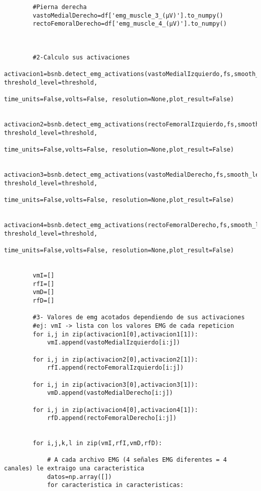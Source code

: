 \begin{lstlisting}
        #Pierna derecha
        vastoMedialDerecho=df['emg_muscle_3_(µV)'].to_numpy()
        rectoFemoralDerecho=df['emg_muscle_4_(µV)'].to_numpy()
        
        
        
        #2-Calculo sus activaciones
        activacion1=bsnb.detect_emg_activations(vastoMedialIzquierdo,fs,smooth_level=smooth, threshold_level=threshold,
                                                    time_units=False,volts=False, resolution=None,plot_result=False)

        activacion2=bsnb.detect_emg_activations(rectoFemoralIzquierdo,fs,smooth_level=smooth, threshold_level=threshold,
                                                    time_units=False,volts=False, resolution=None,plot_result=False)

        activacion3=bsnb.detect_emg_activations(vastoMedialDerecho,fs,smooth_level=smooth, threshold_level=threshold,
                                                    time_units=False,volts=False, resolution=None,plot_result=False)

        activacion4=bsnb.detect_emg_activations(rectoFemoralDerecho,fs,smooth_level=smooth, threshold_level=threshold,
                                                    time_units=False,volts=False, resolution=None,plot_result=False)
        
        
        vmI=[]
        rfI=[]
        vmD=[]
        rfD=[]
        
        #3- Valores de emg acotados dependiendo de sus activaciones
        #ej: vmI -> lista con los valores EMG de cada repeticion
        for i,j in zip(activacion1[0],activacion1[1]):
            vmI.append(vastoMedialIzquierdo[i:j])

        for i,j in zip(activacion2[0],activacion2[1]):
            rfI.append(rectoFemoralIzquierdo[i:j])
            
        for i,j in zip(activacion3[0],activacion3[1]):
            vmD.append(vastoMedialDerecho[i:j])
        
        for i,j in zip(activacion4[0],activacion4[1]):
            rfD.append(rectoFemoralDerecho[i:j])
            
            
        for i,j,k,l in zip(vmI,rfI,vmD,rfD):
            
            # A cada archivo EMG (4 señales EMG diferentes = 4 canales) le extraigo una caracteristica  
            datos=np.array([])
            for caracteristica in caracteristicas:
            

\end{lstlisting}
